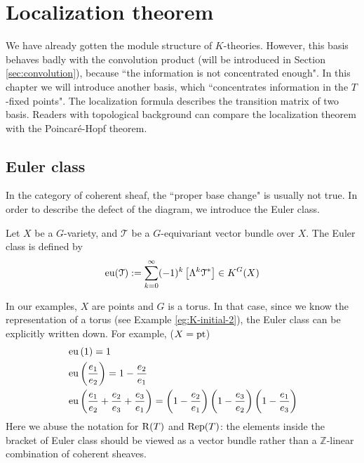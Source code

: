 \chapter{Localization theorem}\label{chap:localization}
We have already gotten the module structure of $K$-theories. However, this basis behaves badly with the convolution product (will be introduced in Section \ref{sec:convolution}), because ``the information is not concentrated enough". In this chapter we will introduce another basis, which ``concentrates information in the $T$-fixed points". The localization formula describes the transition matrix of two basis. Readers with topological background can compare the localization theorem with the Poincaré-Hopf theorem.


\section{Euler class}\label{sec:euler_class}
In the category of coherent sheaf, the ``proper base change" is usually not true. In order to describe the defect of the diagram, we introduce the Euler class.

\begin{defn}
Let $X$ be a $G$-variety, and $\mathcal{T}$ be a $G$-equivariant vector bundle over $X$. The Euler class is defined by
$$\operatorname{\operatorname{eu}}(\mathcal{T}):= \sum_{k=0}^{\infty} (-1)^k \left[ \Lambda^{k} \mathcal{T}^* \right] \in K^G(X) $$
\end{defn}

In our examples, $X$ are points and $G$ is a torus. In that case, since we know the representation of a torus (see Example \ref{eg:K-initial-2}), the Euler class can be explicitly written down. For example, ($X=\operatorname{\operatorname{pt}}$)
\begin{equation*}
\begin{aligned}
  &\operatorname{\operatorname{eu}}\left( 1 \right)=  1\\ 
    &\operatorname{\operatorname{eu}}\left( \frac{e_1}{e_2} \right)=  1-\frac{e_2}{e_1}\\ 
      &\operatorname{\operatorname{eu}}\left(\frac{e_1}{e_2}+\frac{e_2}{e_3}+\frac{e_3}{e_1} \right)=  \left(1-\frac{e_2}{e_1}\right)\left(1-\frac{e_3}{e_2}\right)\left(1-\frac{e_1}{e_3}\right)\\ 
\end{aligned}
\end{equation*}
Here we abuse the notation for $\operatorname{\operatorname{R}}(T)$ and $\operatorname{\operatorname{Rep}}(T)$: the elements inside the bracket of Euler class should be viewed as a vector bundle rather than a $\mathbb{Z}$-linear combination of coherent sheaves. 

